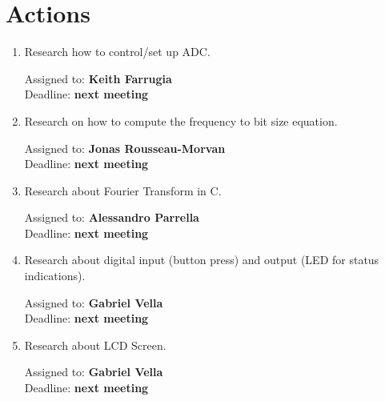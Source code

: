 \documentclass{cce2014-meetings}
\begin{document}
\section*{Actions}

\begin{enumerate}

   \item Research how to control/set up ADC.
         \begin{flushright}
            Assigned to: \textbf{Keith Farrugia} \\
            Deadline: \textbf{next meeting}
         \end{flushright}

   \item Research on how to compute the frequency to bit size equation.
         \begin{flushright}
            Assigned to: \textbf{Jonas Rousseau-Morvan} \\
            Deadline: \textbf{next meeting}
         \end{flushright}

   \item Research about Fourier Transform in C.
         \begin{flushright}
            Assigned to: \textbf{Alessandro Parrella} \\
            Deadline: \textbf{next meeting}
         \end{flushright}

   \item Research about digital input (button press) and output (LED for status indications).
         \begin{flushright}
            Assigned to: \textbf{Gabriel Vella} \\
            Deadline: \textbf{next meeting}
         \end{flushright}

   \item Research about LCD Screen.
         \begin{flushright}
            Assigned to: \textbf{Gabriel Vella} \\
            Deadline: \textbf{next meeting}
         \end{flushright}

\end{enumerate}
\end{document}
